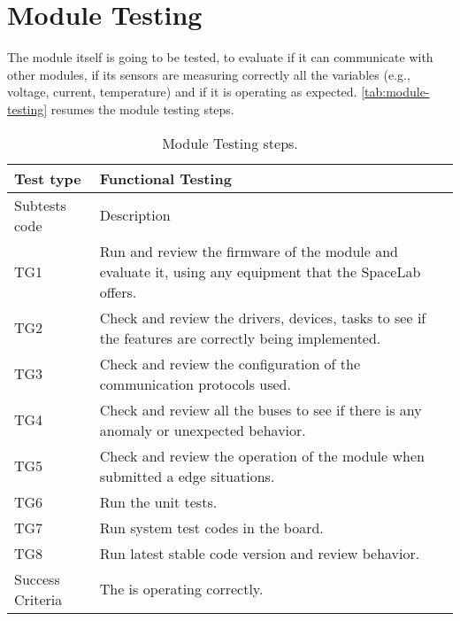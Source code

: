 \section {Module Testing}

The module itself is going to be tested, to evaluate if it can communicate with other modules, if its sensors are measuring correctly all the variables (e.g., voltage, current, temperature) and if it is operating as expected. \autoref{tab:module-testing} resumes the module testing steps.

\begin{table}[!htb]
\centering
\caption{Module Testing steps.}
\label{tab:module-testing}
\begin{tabular}{m{3cm} m{12cm} m{3cm}}
\toprule
Test type & Functional Testing \\
\midrule
\midrule
Subtests code & Description \\ 
\midrule
TG1 & Run and review the firmware of the module and evaluate it, using any equipment that the SpaceLab offers. \\
\midrule
TG2 & Check and review the drivers, devices, tasks to see if the features are correctly being implemented. \\
\midrule
TG3 & Check and review the configuration of the communication protocols used. \\
\midrule
TG4 & Check and review all the buses to see if there is any anomaly or unexpected behavior. \\
\midrule
TG5 & Check and review the operation of the module when submitted a edge situations. \\
\midrule
TG6 & Run the unit tests. \\
\midrule
TG7 & Run system test codes in the board. \\
\midrule
TG8 & Run latest stable code version and review behavior. \\
\midrule
\midrule
Success Criteria & The is operating correctly. \\
\bottomrule
\end{tabular}
\end{table}
